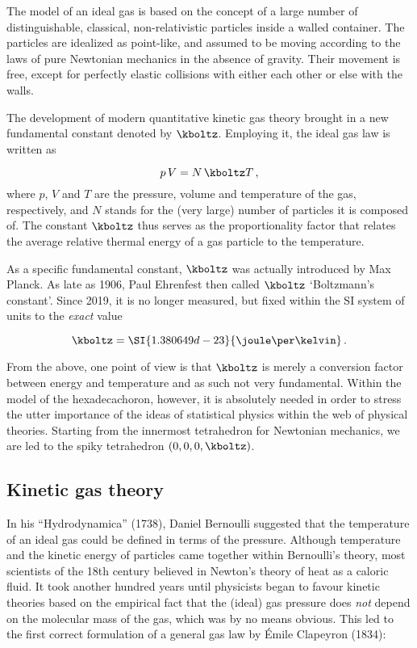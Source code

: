 
\newpage {}
\label{sec:0001}

The model of an ideal gas is based on the concept of a large number of distinguishable, classical, non-relativistic particles inside a walled container. The particles are idealized as point-like, and assumed to be moving according to the laws of pure Newtonian mechanics in the absence of gravity. Their movement is free, except for perfectly elastic collisions with either each other or else with the walls.

The development of modern quantitative kinetic gas theory brought in a new fundamental constant denoted by $\kboltz$. Employing it, the ideal gas law is written as

\begin{equation*}\label{eq:ideal-kb}
  p\, V=N\, \kboltz T\,,
\end{equation*}
%
where $p$, $V$ and $T$ are the pressure, volume and temperature of the gas, respectively, and $N$ stands for the (very large) number of particles it is composed of. The constant $\kboltz$ thus serves as the proportionality factor that relates the average relative thermal energy of a gas particle to the temperature.

As a specific fundamental constant, $\kboltz$ was actually introduced by Max Planck. As late as 1906, Paul Ehrenfest then called $\kboltz$ \enquote*{Boltzmann's constant}. Since 2019, it is no longer measured, but fixed within the SI system of units to the \emph{exact} value

\begin{equation*}
  \kboltz=\SI{1.380649d-23}{\joule \per \kelvin}\,.
\end{equation*}

From the above, one point of view is that $\kboltz$ is merely a conversion factor between energy and temperature and as such not very fundamental. Within the model of the hexadecachoron, however, it is absolutely needed in order to stress the utter importance of the ideas of statistical physics within the web of physical theories. Starting from the innermost tetrahedron for Newtonian mechanics, we are led to the spiky tetrahedron $(0,0,0,\kboltz)$.


\subsection*{Kinetic gas theory}

In his \enquote{Hydrodynamica} (1738), Daniel Bernoulli suggested that the temperature of an ideal gas could be defined in terms of the pressure. Although temperature and the kinetic energy of particles came together within Bernoulli's theory, most scientists of the 18th century believed in Newton's theory of heat as a caloric fluid. It took another hundred years until physicists began to favour kinetic theories based on the empirical fact that the (ideal) gas pressure does \emph{not} depend on the molecular mass of the gas, which was by no means obvious. This led to the first correct formulation of a general gas law by Émile Clapeyron (1834):

